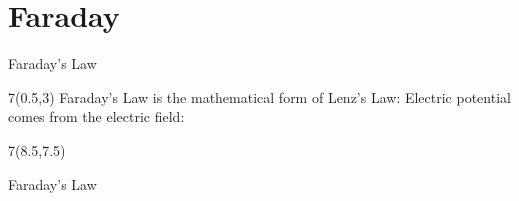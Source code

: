 \section{Faraday}
\begin{frame}{Faraday's Law}
\begin{textblock}{7}(0.5,3)
Faraday's Law is the mathematical form of Lenz's Law:
Electric potential comes from the electric field: 
\end{textblock}

\begin{textblock}{7}(8.5,7.5)
\begin{myblock}[0.95]{Faraday's Law}


\end{myblock}
\end{textblock}
\end{frame}

